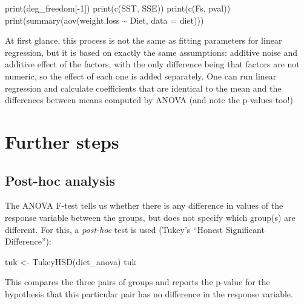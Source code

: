 \documentclass[
  letterpaper,
  DIV=11,
  numbers=noendperiod]{scrreprt}
\newenvironment{Shaded}{\begin{snugshade}}{\end{snugshade}}
\newcommand{\NormalTok}[1]{\textcolor[rgb]{0.00,0.23,0.31}{#1}}
\begin{document}
\begin{Shaded}
\begin{Highlighting}[]
\NormalTok{print(deg\_freedom[{-}1])}
\NormalTok{print(c(SST, SSE))}
\NormalTok{print(c(Fs, pval))}
\NormalTok{print(summary(aov(weight.loss \textasciitilde{} Diet, data = diet)))}
\end{Highlighting}
\end{Shaded}

At first glance, this process is not the same as fitting parameters for
linear regression, but it is based on exactly the same assumptions:
additive noise and additive effect of the factors, with the only
difference being that factors are not numeric, so the effect of each one
is added separately. One can run linear regression and calculate
coefficients that are identical to the mean and the differences between
means computed by ANOVA (and note the p-values too!)

\begin{Shaded}
\end{Shaded}

\section{Further steps}\label{further-steps}

\subsection{Post-hoc analysis}\label{post-hoc-analysis}

The ANOVA F-test tells us whether there is any difference in values of
the response variable between the groups, but does not specify which
group(s) are different. For this, a \emph{post-hoc} test is used
(Tukey's ``Honest Significant Difference''):

\begin{Shaded}
\begin{Highlighting}[]
\NormalTok{tuk \textless{}{-} TukeyHSD(diet\_anova)}
\NormalTok{tuk}
\end{Highlighting}
\end{Shaded}

This compares the three pairs of groups and reports the p-value for the
hypothesis that this particular pair has no difference in the response
variable.
\end{document}
